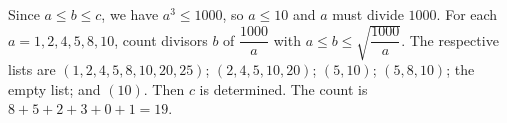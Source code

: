 Since $a\le b\le c$, we have $a^3\le1000$, so $a\le10$ and $a$ must divide $1000$. For each $a=1,2,4,5,8,10$, count divisors $b$ of $\dfrac{1000}{a}$ with $a\le b\le\sqrt{\dfrac{1000}{a}}$. The respective lists are $(1,2,4,5,8,10,20,25)$; $(2,4,5,10,20)$; $(5,10)$; $(5,8,10)$; the empty list; and $(10)$. Then $c$ is determined. The count is $8+5+2+3+0+1=\boxed{19}$.
